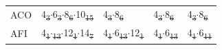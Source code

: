 \documentclass[preprint,numrefs,noinfo,sort&compress]{elsarticle}
\providecommand{\DIFadd}[1]{{\protect\color{blue}\uwave{#1}}} %
\providecommand{\DIFdel}[1]{{\protect\color{red}\sout{#1}}}                      %
\providecommand{\DIFaddFL}[1]{\DIFadd{#1}} %
\providecommand{\DIFdelFL}[1]{\DIFdel{#1}} %
\providecommand{\DIFaddbeginFL}{} %
\providecommand{\DIFaddendFL}{} %
\providecommand{\DIFdelbeginFL}{} %
\providecommand{\DIFdelendFL}{} %
\newcommand{\DIFscaledelfig}{0.5}
\newlength{\DIFdelgraphicswidth} %
\newlength{\DIFdelgraphicsheight} %
\newcommand{\DIFaddincludegraphics}[2][]{{\color{blue}\fbox{\DIFOincludegraphics[#1]{#2}}}} %
\newcommand{\DIFdelincludegraphics}[2][]{%
\sbox{\DIFdelgraphicsbox}{\DIFOincludegraphics[#1]{#2}}%
\settoboxwidth{\DIFdelgraphicswidth}{\DIFdelgraphicsbox} %
\settoboxtotalheight{\DIFdelgraphicsheight}{\DIFdelgraphicsbox} %
\scalebox{\DIFscaledelfig}{%
\parbox[b]{\DIFdelgraphicswidth}{\usebox{\DIFdelgraphicsbox}\\[-\baselineskip] \rule{\DIFdelgraphicswidth}{0em}}\llap{\resizebox{\DIFdelgraphicswidth}{\DIFdelgraphicsheight}{%
\setlength{\unitlength}{\DIFdelgraphicswidth}%
\begin{picture}(1,1)%
\thicklines\linethickness{2pt} %
{\color[rgb]{1,0,0}\put(0,0){\framebox(1,1){}}}%
{\color[rgb]{1,0,0}\put(0,0){\line( 1,1){1}}}%
{\color[rgb]{1,0,0}\put(0,1){\line(1,-1){1}}}%
\end{picture}%
}\hspace*{3pt}}} %
} %
\DeclareRobustCommand{\DIFaddbeginFL}{\DIFOaddbeginFL \let\includegraphics\DIFaddincludegraphics} %
\DeclareRobustCommand{\DIFaddendFL}{\DIFOaddendFL \let\includegraphics\DIFOincludegraphics} %
\DeclareRobustCommand{\DIFdelbeginFL}{\DIFOdelbeginFL \let\includegraphics\DIFdelincludegraphics} %
\DeclareRobustCommand{\DIFdelendFL}{\DIFOaddendFL \let\includegraphics\DIFOincludegraphics} %
\begin{document}
\begin{table}
\begin{threeparttable}
{\begin{tabular}{lllll}
ACO & 4\DIFdelbeginFL \DIFdelFL{\textsubscript{3}\(\cdot\)}\DIFdelendFL \DIFaddbeginFL \DIFaddFL{\(_{\text{3}} \cdot\)}\DIFaddendFL 6\DIFdelbeginFL \DIFdelFL{\textsubscript{3}\(\cdot\)}\DIFdelendFL \DIFaddbeginFL \DIFaddFL{\(_{\text{3}} \cdot\)}\DIFaddendFL 8\DIFdelbeginFL \DIFdelFL{\textsubscript{6}\(\cdot\)}\DIFdelendFL \DIFaddbeginFL \DIFaddFL{\(_{\text{6}} \cdot\)}\DIFaddendFL 10\DIFdelbeginFL \DIFdelFL{\textsubscript{15} }\DIFdelendFL \DIFaddbeginFL \DIFaddFL{\(_{\text{15}}\) }\DIFaddendFL & 4\DIFdelbeginFL \DIFdelFL{\textsubscript{3}\(\cdot\)}\DIFdelendFL \DIFaddbeginFL \DIFaddFL{\(_{\text{3}} \cdot\)}\DIFaddendFL 8\DIFdelbeginFL \DIFdelFL{\textsubscript{6} }\DIFdelendFL \DIFaddbeginFL \DIFaddFL{\(_{\text{6}}\) }\DIFaddendFL & 4\DIFdelbeginFL \DIFdelFL{\textsubscript{3}\(\cdot\)}\DIFdelendFL \DIFaddbeginFL \DIFaddFL{\(_{\text{3}} \cdot\)}\DIFaddendFL 8\DIFdelbeginFL \DIFdelFL{\textsubscript{6} }\DIFdelendFL \DIFaddbeginFL \DIFaddFL{\(_{\text{6}}\) }\DIFaddendFL & 4\DIFdelbeginFL \DIFdelFL{\textsubscript{3}\(\cdot\)}\DIFdelendFL \DIFaddbeginFL \DIFaddFL{\(_{\text{3}} \cdot\)}\DIFaddendFL 8\DIFdelbeginFL \DIFdelFL{\textsubscript{6}}\DIFdelendFL \DIFaddbeginFL \DIFaddFL{\(_{\text{6}}\)}\DIFaddendFL \\
AFI & 4\DIFdelbeginFL \DIFdelFL{\textsubscript{1}\(\cdot\)\textsubscript{13}\(\cdot\)}\DIFdelendFL \DIFaddbeginFL \DIFaddFL{\(_{\text{1}} \cdot\)\(_{\text{13}} \cdot\)}\DIFaddendFL 12\DIFdelbeginFL \DIFdelFL{\textsubscript{1}\(\cdot\)}\DIFdelendFL \DIFaddbeginFL \DIFaddFL{\(_{\text{1}} \cdot\)}\DIFaddendFL 14\DIFdelbeginFL \DIFdelFL{\textsubscript{7} }\DIFdelendFL \DIFaddbeginFL \DIFaddFL{\(_{\text{7}}\) }\DIFaddendFL & 4\DIFdelbeginFL \DIFdelFL{\textsubscript{1}\(\cdot\)}\DIFdelendFL \DIFaddbeginFL \DIFaddFL{\(_{\text{1}} \cdot\)}\DIFaddendFL 6\DIFdelbeginFL \DIFdelFL{\textsubscript{13}\(\cdot\)}\DIFdelendFL \DIFaddbeginFL \DIFaddFL{\(_{\text{13}} \cdot\)}\DIFaddendFL 12\DIFdelbeginFL \DIFdelFL{\textsubscript{1} }\DIFdelendFL \DIFaddbeginFL \DIFaddFL{\(_{\text{1}}\) }\DIFaddendFL & 4\DIFdelbeginFL \DIFdelFL{\textsubscript{1}\(\cdot\)}\DIFdelendFL \DIFaddbeginFL \DIFaddFL{\(_{\text{1}} \cdot\)}\DIFaddendFL 6\DIFdelbeginFL \DIFdelFL{\textsubscript{13} }\DIFdelendFL \DIFaddbeginFL \DIFaddFL{\(_{\text{13}}\) }\DIFaddendFL & 4\DIFdelbeginFL \DIFdelFL{\textsubscript{1}\(\cdot\)}\DIFdelendFL \DIFaddbeginFL \DIFaddFL{\(_{\text{1}} \cdot\)}\DIFaddendFL 6\DIFdelbeginFL \DIFdelFL{\textsubscript{11}}\DIFdelendFL \DIFaddbeginFL \DIFaddFL{\(_{\text{11}}\)}\DIFaddendFL \\

\end{tabular}}
\end{threeparttable}
\end{table}
\end{document}
